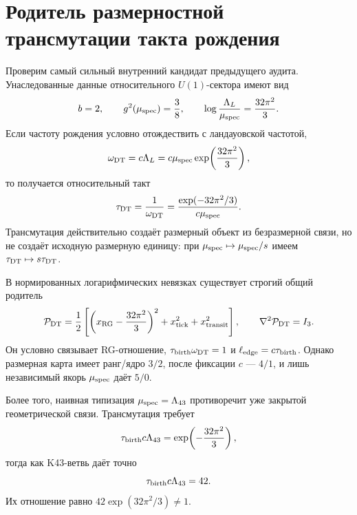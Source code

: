 \chapter{Родитель размерностной трансмутации такта рождения}
\label{ch:v10-nonequilibrium-bath-birth-tick-dimensional-transmutation}

Проверим самый сильный внутренний кандидат предыдущего аудита. Унаследованные
данные относительного $U(1)$-сектора имеют вид
\begin{equation}
 b=2,\qquad g^2(\mu_{\rm spec})=\frac38,
 \qquad
 \log\frac{\Lambda_L}{\mu_{\rm spec}}=\frac{32\pi^2}{3}.
\end{equation}
Если частоту рождения условно отождествить с ландауовской частотой,
\begin{equation}
 \omega_{\rm DT}=c\Lambda_L
 =c\mu_{\rm spec}\exp\!\left(\frac{32\pi^2}{3}\right),
\end{equation}
то получается относительный такт
\begin{equation}
 \tau_{\rm DT}=\frac1{\omega_{\rm DT}}
 =\frac{\exp(-32\pi^2/3)}{c\mu_{\rm spec}}.
\end{equation}
Трансмутация действительно создаёт размерный объект из безразмерной связи,
но не создаёт исходную размерную единицу: при
$\mu_{\rm spec}\mapsto\mu_{\rm spec}/s$ имеем
$\tau_{\rm DT}\mapsto s\tau_{\rm DT}$.

В нормированных логарифмических невязках существует строгий общий родитель
\begin{equation}
 \mathcal P_{\rm DT}=\frac12\left[
 \left(x_{\rm RG}-\frac{32\pi^2}{3}\right)^2
 +x_{\rm tick}^2+x_{\rm transit}^2\right],
 \qquad \nabla^2\mathcal P_{\rm DT}=I_3.
\end{equation}
Он условно связывает RG-отношение, $\tau_{\rm birth}\omega_{\rm DT}=1$ и
$\ell_{\rm edge}=c\tau_{\rm birth}$. Однако размерная карта имеет
ранг/ядро $3/2$, после фиксации $c$ --- $4/1$, и лишь независимый якорь
$\mu_{\rm spec}$ даёт $5/0$.

Более того, наивная типизация $\mu_{\rm spec}=\Lambda_{43}$ противоречит
уже закрытой геометрической связи. Трансмутация требует
\begin{equation}
 \tau_{\rm birth}c\Lambda_{43}=\exp\!\left(-\frac{32\pi^2}{3}\right),
\end{equation}
тогда как K43-ветвь даёт точно
\begin{equation}
 \tau_{\rm birth}c\Lambda_{43}=42.
\end{equation}
Их отношение равно $42\exp(32\pi^2/3)\ne1$.


